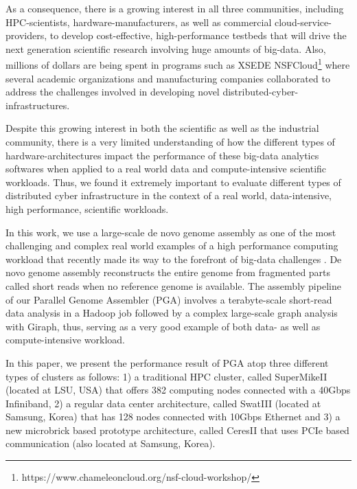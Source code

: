 \documentclass[conference]{IEEEtran}
\begin{document}
As a consequence, there is a growing interest in all three communities, including HPC-scientists, hardware-manufacturers, as well as commercial cloud-service-providers, to develop cost-effective, high-performance testbeds that will drive the next generation scientific research involving huge amounts of big-data. 
Also, millions of dollars are being spent in programs such as XSEDE NSFCloud\footnote{https://www.chameleoncloud.org/nsf-cloud-workshop/} where several academic organizations and manufacturing companies collaborated to address the challenges involved in developing novel distributed-cyber-infrastructures. 

Despite this growing interest in both the scientific as well as the industrial community, there is a very limited understanding of how the different types of hardware-architectures impact the performance of these big-data analytics softwares when applied to a real world data and compute-intensive scientific workloads. 
Thus, we found it extremely important to evaluate different types of distributed cyber infrastructure in the context of a real world, data-intensive, high performance, scientific workloads.   

In this work, we use a large-scale de novo genome assembly as one of the most challenging and complex real world examples of a high performance computing workload that recently made its way to the forefront of big-data challenges \cite{bigGenome:graphtraverse} \cite{biggenome:kmerpartition}.
De novo genome assembly reconstructs the entire genome from fragmented parts called short reads when no reference genome is available. 
The assembly pipeline of our Parallel Genome Assembler (PGA) involves a terabyte-scale short-read data analysis in a Hadoop job followed by a complex large-scale graph analysis with Giraph, thus, serving as a very good example of both data- as well as compute-intensive workload. 

In this paper, we present the performance result of PGA atop three different types of clusters as follows: 
1) a traditional HPC cluster, called SuperMikeII (located at LSU, USA) that offers 382 computing nodes connected with a 40Gbps Infiniband, 
2) a regular data center architecture, called SwatIII (located at Samsung, Korea) that has 128 nodes connected with 10Gbps Ethernet and 
3) a new microbrick based prototype architecture, called CeresII that uses PCIe based communication (also located at Samsung, Korea). 
\end{document}
